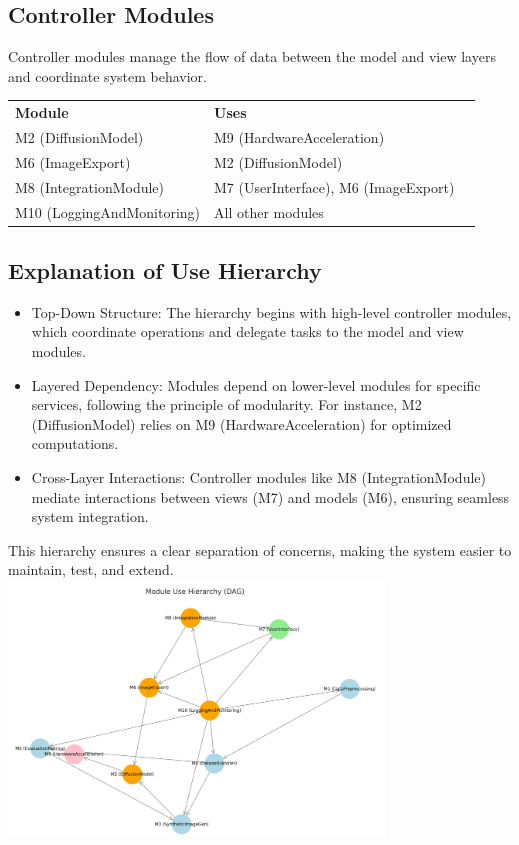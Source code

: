 \documentclass[12pt, titlepage]{article}
\begin{document}
\subsection{Controller Modules}
Controller modules manage the flow of data between the model and view layers and coordinate system behavior.

\begin{table}[H]
  \begin{tabular}{lll}
  \textbf{Module} & \textbf{Uses} &  \\
  M2 (DiffusionModel) & M9 (HardwareAcceleration) &  \\
  M6 (ImageExport) & M2 (DiffusionModel) &  \\
  M8 (IntegrationModule) & M7 (UserInterface), M6 (ImageExport) &  \\
  M10 (LoggingAndMonitoring) & All other modules & 
  \end{tabular}
\end{table}

\subsection{Explanation of Use Hierarchy}

\begin{itemize}
  \item Top-Down Structure: The hierarchy begins with high-level controller modules, which coordinate operations and delegate tasks to the model and view modules.
  \item Layered Dependency: Modules depend on lower-level modules for specific services, following the principle of modularity. For instance, M2 (DiffusionModel) relies on M9 (HardwareAcceleration) for optimized computations.
  \item Cross-Layer Interactions: Controller modules like M8 (IntegrationModule) mediate interactions between views (M7) and models (M6), ensuring seamless system integration.
\end{itemize}

This hierarchy ensures a clear separation of concerns, making the system easier to maintain, test, and extend.
\includegraphics[width=10cm]{image}
\end{document}
